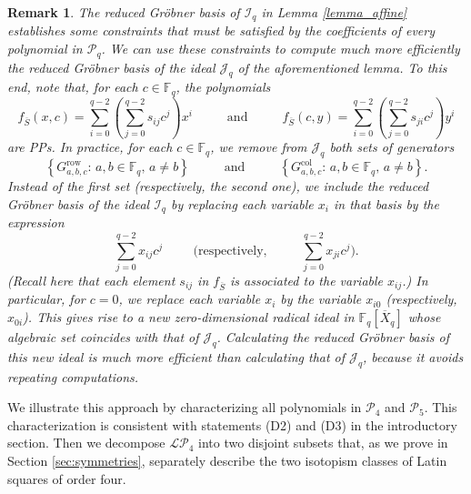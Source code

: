 \documentclass[pdflatex,sn-mathphys-num]{sn-jnl}
\theoremstyle{thmstyleone}%
\newtheorem{remark}{Remark}[section]
\begin{document}
\begin{remark}\label{remak_affine} The reduced Gr\"obner basis of $\mathcal{I}_q$ in Lemma \ref{lemma_affine} establishes some constraints that must be satisfied by the coefficients of every polynomial in $\mathcal{P}_q$. We can use these constraints to compute much more efficiently the reduced Gr\"obner basis of the ideal $\mathcal{J}_q$ of the aforementioned lemma. To this end, note that, for each $c\in\mathbb{F}_q$, the polynomials 
\[f_{\overline{S}}(x,c)=\sum_{i=0}^{q-2}\left(\sum_{j=0}^{q-2}s_{ij}c^j\right)x^i \hspace{1cm} \text{ and } \hspace{1cm} f_{\overline{S}}(c,y)=\sum_{i=0}^{q-2}\left(\sum_{j=0}^{q-2}s_{ji}c^j\right)y^i\]
are PPs. In practice, for each $c\in \mathbb{F}_q$, we remove from $\mathcal{J}_q$ both sets of generators
\[\left\{G^{\mathrm{row}}_{a,b,c}\colon\, a,b\in \mathbb{F}_q,\,a\neq b\right\}\hspace{1cm} \text{ and } \hspace{1cm}\left\{G^{\mathrm{col}}_{a,b,c}\colon\, a,b\in \mathbb{F}_q,\,a\neq b\right\}.\] 
Instead of the first set (respectively, the second one), we include the reduced Gr\"obner basis of the ideal $\mathcal{I}_q$ by replacing each variable $x_i$ in that basis by the expression 
\[\sum_{j=0}^{q-2} x_{ij}c^j \hspace{1cm} \text{(respectively, } \hspace{1cm} \sum_{j=0}^{q-2} x_{ji}c^j).\] (Recall here that each element $s_{ij}$ in $f_{\overline{S}}$ is associated to the variable $x_{ij}$.) In particular, for $c=0$, we replace each variable $x_i$ by the variable $x_{i0}$ (respectively, $x_{0i}$). This gives rise to a new zero-dimensional radical ideal in $\mathbb{F}_q[\overline{X}_q]$ whose algebraic set coincides with that of $\mathcal{J}_q$. Calculating the reduced Gr\"obner basis of this new ideal is much more efficient than calculating that of $\mathcal{J}_q$, because it avoids repeating computations.
\end{remark}

\vspace{0.2cm}

We illustrate this approach by characterizing all polynomials in $\mathcal{P}_4$ and $\mathcal{P}_5$. This characterization is consistent with statements (D2) and (D3) in the introductory section. Then we decompose $\mathcal{LP}_4$ into two disjoint subsets that, as we prove in Section \ref{sec:symmetries}, separately describe the two isotopism classes of Latin squares of order four.
\end{document}
